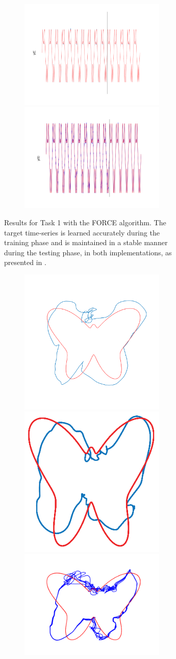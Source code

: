 \begin{figure}
\begin{subfigure}{\textwidth}
\begin{subfigure}{\textwidth}
        \end{subfigure}
        
        
        \textbf{}\begin{subfigure}{\textwidth}
        \centering
        
        \includegraphics[trim=2cm 0cm 0cm 0cm, clip=true,height=0.1\linewidth,width=.45\linewidth]{Figures/MATLAB/FORCE_T1_CoordinateY.png}
        \includegraphics[trim=2cm 0cm 0cm 0cm, clip=true,height=0.1\linewidth,width=.45\linewidth]{Figures/Python/FORCE_T1_CoordinateY.png}
        
        \end{subfigure}
        

    \caption{Results for Task 1 with the FORCE algorithm. The target time‐series is learned accurately during the training phase and is maintained in a stable manner during the testing phase, in both implementations, as presented in \cite{pyle2019}.}
    \label{Fig:compTask1FORCE}
    \end{subfigure}

    \begin{subfigure}{\textwidth}
        \centering
        
        \textbf{}\begin{subfigure}{\textwidth}
        \centering
    
        \includegraphics[trim=1.3cm 2cm 1.3cm 2cm, clip=true, height=.2\linewidth]{Figures/MATLAB/RMHL_T1_TimeSeries.png}
        \hspace{3em}
        \includegraphics[height=.19\linewidth]{Figures/Orig/RMHL_T1_TimeSeries.png}
        \hspace{3em}
        \includegraphics[trim=1.5cm 1.2cm 1.5cm 1.2cm, clip=true,  height=.2\linewidth]{Figures/Python/RMHL_T1_TimeSeries.png}
        

\end{subfigure}
\end{subfigure}
\end{figure}
